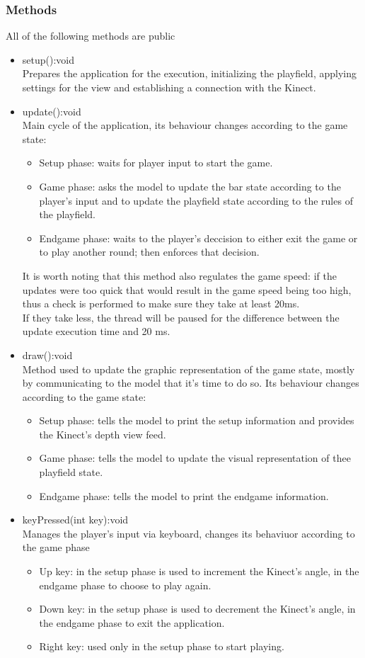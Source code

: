 \documentclass[]{article}
\begin{document}
\subsubsection{Methods}
All of the following methods are public
	\begin{itemize}
		\item setup():void \\ Prepares the application for the execution, initializing the playfield, applying settings for the view and establishing a connection with the Kinect.
		\item update():void \\ Main cycle of the application, its behaviour changes according to the game state:
			\begin{itemize}
				\item Setup phase: waits for player input to start the game.
				\item Game phase: asks the model to update the bar state according to the player's input and to update the playfield state according to the rules of the playfield.
				\item Endgame phase: waits to the player's deccision to either exit the game or to play another round; then enforces that decision.
			 \end{itemize}
			 It is worth noting that this method also regulates the game speed: if the updates were too quick that would result in the game speed being too high, thus a check is performed to make sure they take at least 20ms.\\
			 If they take less, the thread will be paused for the difference between the update execution time and 20 ms.
		\item draw():void \\ Method used to update the graphic representation of the game state, mostly by communicating to the model that it's time to do so. Its behaviour changes according to the game state:
			 \begin{itemize}
				 \item Setup phase: tells the model to print the setup information and provides the Kinect's depth view feed.
				 \item Game phase: tells the model to update the visual representation of thee playfield state.
				 \item Endgame phase: tells the model to print the endgame information.
			 \end{itemize}
		\item keyPressed(int key):void \\ Manages the player's input via keyboard, changes its behaviuor according to the game phase
			 \begin{itemize}
				\item Up key: in the setup phase is used to increment the Kinect's angle, in the endgame phase to choose to play again.
				\item Down key: in the setup phase is used to decrement the Kinect's angle, in the endgame phase to exit the application.
				\item Right key: used only in the setup phase to start playing. 
			 \end{itemize}
	\end{itemize}
\newpage
\end{document}
